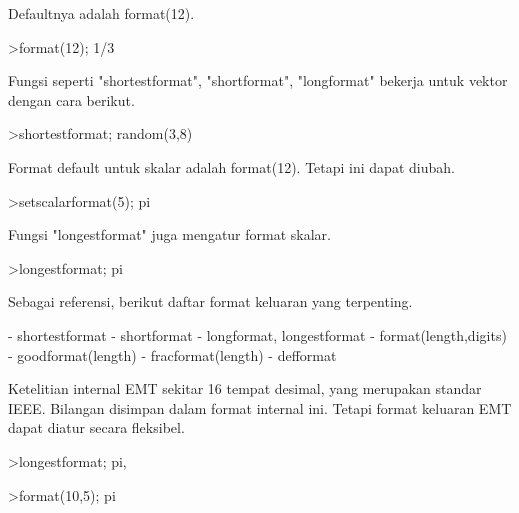 \documentclass[a4paper,10pt]{article}
\begin{document}
\begin{eulernotebook}
\begin{euleroutput}
  Defaultnya adalah format(12).
  
\end{euleroutput}
\begin{eulerprompt}
>format(12); 1/3
\end{eulerprompt}
\begin{euleroutput}
  
  Fungsi seperti "shortestformat", "shortformat", "longformat" bekerja untuk vektor dengan cara berikut.
  
\end{euleroutput}
\begin{eulerprompt}
>shortestformat; random(3,8)
\end{eulerprompt}
\begin{euleroutput}
  
  Format default untuk skalar adalah format(12). Tetapi ini dapat diubah.
  
\end{euleroutput}
\begin{eulerprompt}
>setscalarformat(5); pi
\end{eulerprompt}
\begin{euleroutput}
  
  Fungsi "longestformat" juga mengatur format skalar.
  
\end{euleroutput}
\begin{eulerprompt}
>longestformat; pi
\end{eulerprompt}
\begin{euleroutput}
  
  Sebagai referensi, berikut daftar format keluaran yang terpenting.
  
  - shortestformat
  - shortformat
  - longformat, longestformat
  - format(length,digits)
  - goodformat(length)
  - fracformat(length)
  - defformat
  
  Ketelitian internal EMT sekitar 16 tempat desimal, yang merupakan standar IEEE. Bilangan disimpan dalam format internal ini. Tetapi format keluaran EMT dapat diatur secara fleksibel.
  
\end{euleroutput}
\begin{eulerprompt}
>longestformat; pi,
\end{eulerprompt}
\begin{euleroutput}
  
\end{euleroutput}
\begin{eulerprompt}
>format(10,5); pi
\end{eulerprompt}
\begin{euleroutput}
  

\end{euleroutput}
\end{eulernotebook}
\end{document}
